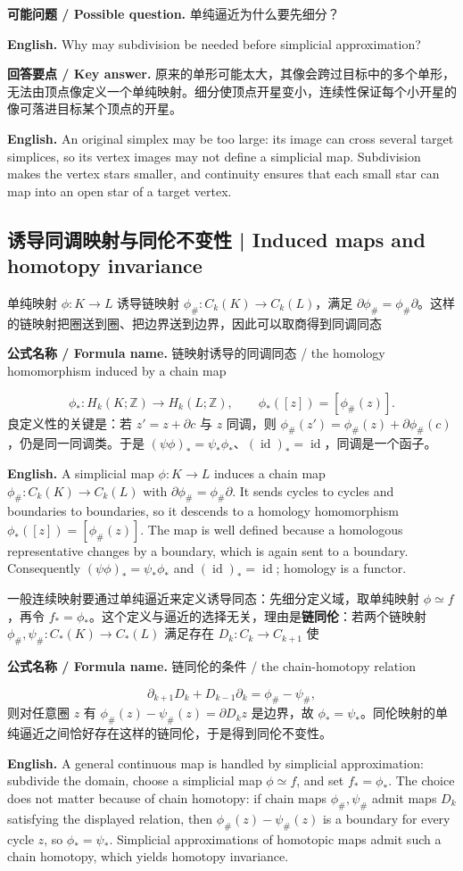 \documentclass[UTF8,11pt,a4paper]{ctexart}
\newcommand{\EN}[1]{\par\noindent\textbf{English.} #1\par}
\newcommand{\FORMULA}[2]{\par\noindent\textbf{公式名称 / Formula name.} #1 / #2\par}
\newcommand{\ASK}[4]{\par\noindent\textbf{可能问题 / Possible question.} #1\par\EN{#2}\noindent\textbf{回答要点 / Key answer.} #3\par\EN{#4}\medskip}
\begin{document}
\ASK{单纯逼近为什么要先细分？}{Why may subdivision be needed before simplicial approximation?}{原来的单形可能太大，其像会跨过目标中的多个单形，无法由顶点像定义一个单纯映射。细分使顶点开星变小，连续性保证每个小开星的像可落进目标某个顶点的开星。}{An original simplex may be too large: its image can cross several target simplices, so its vertex images may not define a simplicial map. Subdivision makes the vertex stars smaller, and continuity ensures that each small star can map into an open star of a target vertex.}

\subsection{诱导同调映射与同伦不变性 | Induced maps and homotopy invariance}
\noindent 单纯映射 $\phi:K\to L$ 诱导链映射 $\phi_\#:C_k(K)\to C_k(L)$，满足 $\partial\phi_\#=\phi_\#\partial$。这样的链映射把圈送到圈、把边界送到边界，因此可以取商得到同调同态
\FORMULA{链映射诱导的同调同态}{the homology homomorphism induced by a chain map}
\[
\phi_*:H_k(K;\mathbb Z)\to H_k(L;\mathbb Z),\qquad
\phi_*([z])=[\phi_\#(z)].
\]
良定义性的关键是：若 $z'=z+\partial c$ 与 $z$ 同调，则 $\phi_\#(z')=\phi_\#(z)+\partial\phi_\#(c)$，仍是同一同调类。于是 $(\psi\phi)_*=\psi_*\phi_*$、$(\operatorname{id})_*=\operatorname{id}$，同调是一个函子。
\EN{A simplicial map $\phi:K\to L$ induces a chain map $\phi_\#:C_k(K)\to C_k(L)$ with $\partial\phi_\#=\phi_\#\partial$. It sends cycles to cycles and boundaries to boundaries, so it descends to a homology homomorphism $\phi_*([z])=[\phi_\#(z)]$. The map is well defined because a homologous representative changes by a boundary, which is again sent to a boundary. Consequently $(\psi\phi)_*=\psi_*\phi_*$ and $(\operatorname{id})_*=\operatorname{id}$; homology is a functor.}

\noindent 一般连续映射要通过单纯逼近来定义诱导同态：先细分定义域，取单纯映射 $\phi\simeq f$，再令 $f_*=\phi_*$。这个定义与逼近的选择无关，理由是\textbf{链同伦}：若两个链映射 $\phi_\#,\psi_\#:C_*(K)\to C_*(L)$ 满足存在 $D_k:C_k\to C_{k+1}$ 使
\FORMULA{链同伦的条件}{the chain-homotopy relation}
\[
\partial_{k+1}D_k+D_{k-1}\partial_k=\phi_\#-\psi_\#,
\]
则对任意圈 $z$ 有 $\phi_\#(z)-\psi_\#(z)=\partial D_kz$ 是边界，故 $\phi_*=\psi_*$。同伦映射的单纯逼近之间恰好存在这样的链同伦，于是得到同伦不变性。
\EN{A general continuous map is handled by simplicial approximation: subdivide the domain, choose a simplicial map $\phi\simeq f$, and set $f_*=\phi_*$. The choice does not matter because of chain homotopy: if chain maps $\phi_\#,\psi_\#$ admit maps $D_k$ satisfying the displayed relation, then $\phi_\#(z)-\psi_\#(z)$ is a boundary for every cycle $z$, so $\phi_*=\psi_*$. Simplicial approximations of homotopic maps admit such a chain homotopy, which yields homotopy invariance.}
\end{document}
